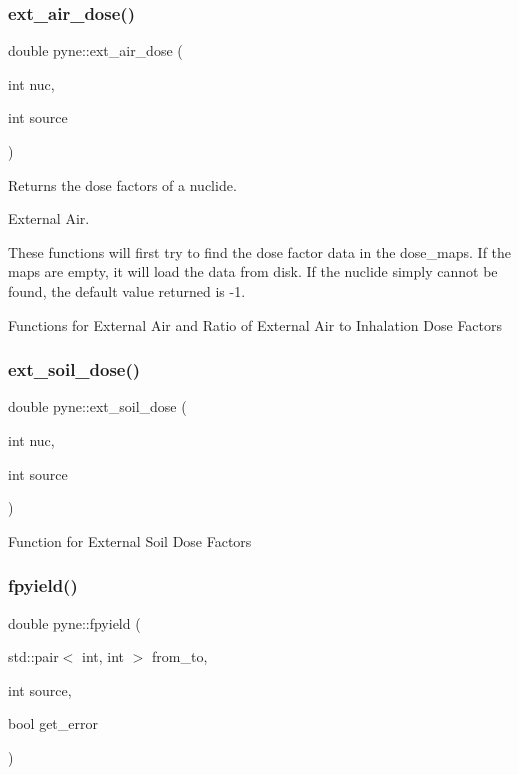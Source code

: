 \subsubsection{\texorpdfstring{ext\+\_\+air\+\_\+dose()}{ext\_air\_dose()}}
{\footnotesize\ttfamily double pyne\+::ext\+\_\+air\+\_\+dose (\begin{DoxyParamCaption}\item[{int}]{nuc,  }\item[{int}]{source }\end{DoxyParamCaption})}



Returns the dose factors of a nuclide. 

External Air.

These functions will first try to find the dose factor data in the dose\+\_\+maps. If the maps are empty, it will load the data from disk. If the nuclide simply cannot be found, the default value returned is -\/1.

Functions for External Air and Ratio of External Air to Inhalation Dose Factors \mbox{\label{namespacepyne_a09838b0682aec7c3b6b5d79ab95ed743}} 
\subsubsection{\texorpdfstring{ext\+\_\+soil\+\_\+dose()}{ext\_soil\_dose()}}
{\footnotesize\ttfamily double pyne\+::ext\+\_\+soil\+\_\+dose (\begin{DoxyParamCaption}\item[{int}]{nuc,  }\item[{int}]{source }\end{DoxyParamCaption})}

Function for External Soil Dose Factors \mbox{\label{namespacepyne_aff6ebb85fad0e8c4001fcfef4d334c8c}} 
\subsubsection{\texorpdfstring{fpyield()}{fpyield()}}
{\footnotesize\ttfamily double pyne\+::fpyield (\begin{DoxyParamCaption}\item[{std\+::pair$<$ int, int $>$}]{from\+\_\+to,  }\item[{int}]{source,  }\item[{bool}]{get\+\_\+error }\end{DoxyParamCaption})}



